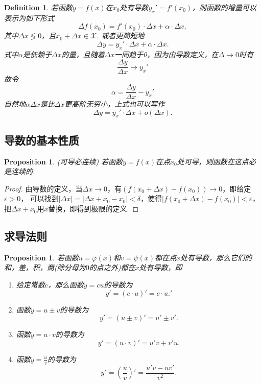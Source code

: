 \documentclass{article}
\newtheorem{proposition}[theorem]{Proposition}
\newtheorem{definition}[theorem]{Definition}
\begin{document}
\begin{definition}
\rm 若函数$y=f(x)$在$x_0$处有导数$y_x'=f'(x_0)$，则函数的增量可以表示为如下形式
$$
\Delta f(x_0) = f'(x_0) \cdot \Delta x + \alpha \cdot \Delta x,
$$
其中$\Delta x \lessgtr 0$，且$x_0 + \Delta x \in \mathcal{X}$. 或者更简短地
$$
\Delta y = y_x'\cdot \Delta x + \alpha \cdot \Delta x.
$$
式中$\alpha$是依赖于$\Delta x$的量，且随着$\Delta x$一同趋于0，因为由导数定义，在$\Delta \rightarrow 0$时有
$$
\frac{\Delta y}{\Delta x} \rightarrow y_x'
$$
故令
$$
\alpha =  \frac{\Delta y}{\Delta x} - y_x'
$$
自然地$\alpha \Delta x$是比$\Delta x$更高阶无穷小，上式也可以写作
$$
\Delta y = y_x' \cdot \Delta x + o(\Delta x).
$$
\end{definition}

\subsection{导数的基本性质}

\begin{proposition}
\rm {\color{red} (可导必连续)} 若函数$y = f(x)$在点$x_0$处可导，则函数在这点必是连续的.
\end{proposition}

\begin{proof}
由导数的定义，当$\Delta x \rightarrow 0$，有$(f(x_0 + \Delta x) - f(x_0)) \rightarrow 0$，即给定$\varepsilon > 0$， 可以找到$|\Delta x| = |\Delta x + x_0-x_0| < \delta$，使得$|f(x_0 + \Delta x) - f(x_0)| < \varepsilon$，把$\Delta x+ x_0$用$x$替换，即得到极限的定义.
\end{proof}

\subsection{求导法则}

\begin{proposition}
\rm 若函数$u=\varphi(x)$和$v=\psi(x)$都在点$x$处有导数，那么它们的和，差，积，商(除分母为$0$的点之外)都在$x$处有导数，即
\begin{enumerate}
	\item 给定常数$c$，那么函数$y = cu$的导数为 
	$$
	y' = (c\cdot u)' = c \cdot u.'
	$$
	\item 函数$y = u \pm v$的导数为
	$$
	y' = (u \pm v)' = u' \pm v'.
	$$
	\item 函数$y = u \cdot v$的导数为
	$$
	y' = (u \cdot v)' = u'v + v'u.
	$$
	\item 函数$y = \frac{u}{v}$的导数为
	$$
	y' = (\frac{u}{v})' = \frac{u'v - uv'}{v^2}.
	$$
\end{enumerate}
\end{proposition}
\end{document}
